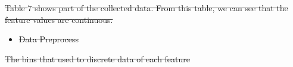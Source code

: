 \documentclass[
 size=14pt,
 paper=smartboard,  %
 mode=present, 		%
 display=slides, 	%
 style=tuliplab,  	%
 pauseslide,
 fleqn,leqno]{powerdot}
\providecommand{\DIFdeltex}[1]{{\protect\color{red}\sout{#1}}}                      %
\providecommand{\DIFdelbegin}{} %
\providecommand{\DIFdelend}{} %
\providecommand{\DIFdelFL}[1]{\DIFdel{#1}} %
\providecommand{\DIFdel}[1]{\texorpdfstring{\DIFdeltex{#1}}{}} %
\newcommand{\DIFscaledelfig}{0.5}
\newlength{\DIFdelgraphicswidth} %
\newlength{\DIFdelgraphicsheight} %
\newcommand{\DIFdelincludegraphics}[2][]{%
\sbox{\DIFdelgraphicsbox}{\DIFOincludegraphics[#1]{#2}}%
\settoboxwidth{\DIFdelgraphicswidth}{\DIFdelgraphicsbox} %
\settoboxtotalheight{\DIFdelgraphicsheight}{\DIFdelgraphicsbox} %
\scalebox{\DIFscaledelfig}{%
\parbox[b]{\DIFdelgraphicswidth}{\usebox{\DIFdelgraphicsbox}\\[-\baselineskip] \rule{\DIFdelgraphicswidth}{0em}}\llap{\resizebox{\DIFdelgraphicswidth}{\DIFdelgraphicsheight}{%
\setlength{\unitlength}{\DIFdelgraphicswidth}%
\begin{picture}(1,1)%
\thicklines\linethickness{2pt} %
{\color[rgb]{1,0,0}\put(0,0){\framebox(1,1){}}}%
{\color[rgb]{1,0,0}\put(0,0){\line( 1,1){1}}}%
{\color[rgb]{1,0,0}\put(0,1){\line(1,-1){1}}}%
\end{picture}%
}\hspace*{3pt}}} %
} %
\DeclareRobustCommand{\DIFdelbegin}{\DIFOdelbegin \let\includegraphics\DIFdelincludegraphics} %
\DeclareRobustCommand{\DIFdelend}{\DIFOaddend \let\includegraphics\DIFOincludegraphics} %
\begin{document}
\DIFdelbegin %
\DIFdel{Table $7$ shows part of the collected data.
From this table,
we can see that the feature values are continuous.
}%
\DIFdelend %

\DIFdelbegin %
\DIFdelend %


\DIFdelbegin %
\begin{itemize}%
\item%
\DIFdel{Data Preprocess
}
\end{itemize}%

{%
\DIFdelFL{The bins that used to discrete data of each feature}}
\end{document}
